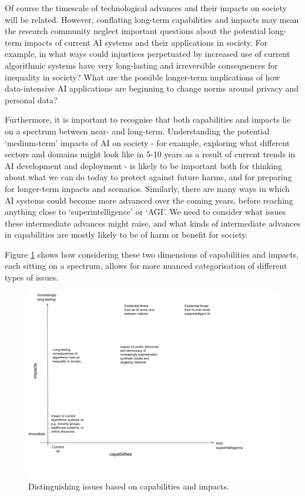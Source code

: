 \documentclass[sigconf]{acmart}
\begin{document}
Of course the timescale of technological advances and their impacts on society will be related. However, conflating long-term capabilities and impacts may mean the research community neglect important questions about the potential long-term impacts of current AI systems and their applications in society. For example, in what ways could injustices perpetuated by increased use of current algorithmic systems have very long-lasting and irreversible consequences for inequality in society? What are the possible longer-term implications of how data-intensive AI applications are beginning to change norms around privacy and personal data? \cite{newellmarabelli2015}

Furthermore, it is important to recognise that both capabilities and impacts lie on a spectrum between near- and long-term. Understanding the potential `medium-term' impacts of AI on society - for example, exploring what different sectors and domains might look like in 5-10 years as a result of current trends in AI development and deployment - is likely to be important both for thinking about what we can do today to protect against future harms, and for preparing for longer-term impacts and scenarios. Similarly, there are many ways in which AI systems could become more advanced over the coming years, before reaching anything close to `superintelligence' or `AGI'. We need to consider what issues these intermediate advances might raise, and what kinds of intermediate advances in capabilities are mostly likely to be of harm or benefit for society.

Figure \ref{fig:1} shows how considering these two dimensions of capabilities and impacts, each sitting on a spectrum, allows for more nuanced categorisation of different types of issues.

\begin{figure}[t]
    \centering
    \includegraphics[width=.9\textwidth]{figure1.png}
    \caption{Distinguishing issues based on capabilities and impacts.} 
    \label{fig:1}
\end{figure}
\end{document}
